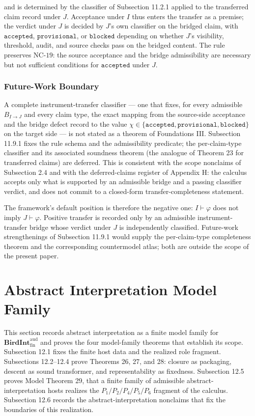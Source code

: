 \documentclass[11pt]{article}
\theoremstyle{definition}
\begin{document}
and is determined by the classifier of Subsection 11.2.1 applied to the transferred claim record under \(J\). Acceptance under \(I\) thus enters the transfer as a premise; the verdict under \(J\) is decided by \(J\)'s own classifier on the bridged claim, with \(\texttt{accepted}\), \(\texttt{provisional}\), or \(\texttt{blocked}\) depending on whether \(J\)'s visibility, threshold, audit, and source checks pass on the bridged content. The rule preserves \(\mathrm{NC}\text{-}19\): the source acceptance and the bridge admissibility are necessary but not sufficient conditions for \(\texttt{accepted}\) under \(J\).

\subsubsection{Future-Work Boundary}

A complete instrument-transfer classifier --- one that fixes, for every admissible \(B_{I\to J}\) and every claim type, the exact mapping from the source-side acceptance and the bridge defect record to the value \(\chi\in\{\texttt{accepted},\texttt{provisional},\texttt{blocked}\}\) on the target side --- is not stated as a theorem of Foundations III. Subsection 11.9.1 fixes the rule schema and the admissibility predicate; the per-claim-type classifier and its associated soundness theorem (the analogue of Theorem 23 for transferred claims) are deferred. This is consistent with the scope nonclaims of Subsection 2.4 and with the deferred-claims register of Appendix H: the calculus accepts only what is supported by an admissible bridge and a passing classifier verdict, and does not commit to a closed-form transfer-completeness statement.

The framework's default position is therefore the negative one: \(I\vdash\varphi\) does not imply \(J\vdash\varphi\). Positive transfer is recorded only by an admissible instrument-transfer bridge whose verdict under \(J\) is independently classified. Future-work strengthenings of Subsection 11.9.1 would supply the per-claim-type completeness theorem and the corresponding countermodel atlas; both are outside the scope of the present paper.
 \section{Abstract Interpretation Model Family}

This section records abstract interpretation as a finite model family for \(\mathbf{BirdInt}^{\mathrm{aud}}_{\mathrm{fin}}\) and proves the four model-family theorems that establish its scope. Subsection 12.1 fixes the finite host data and the realized role fragment. Subsections 12.2--12.4 prove Theorems 26, 27, and 28: closure as packaging, descent as sound transformer, and representability as fixedness. Subsection 12.5 proves Model Theorem 29, that a finite family of admissible abstract-interpretation hosts realizes the \(P_1/P_2/P_4/P_5/P_6\) fragment of the calculus. Subsection 12.6 records the abstract-interpretation nonclaims that fix the boundaries of this realization.
\end{document}
